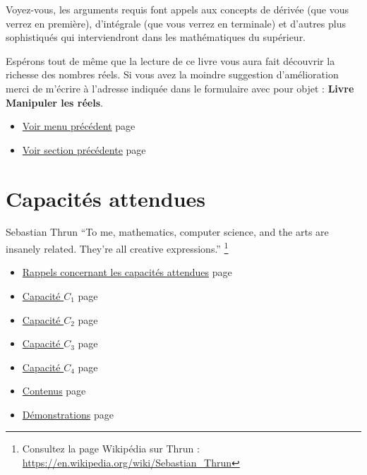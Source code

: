 \documentclass[a4paper,11pt]{book}
\begin{document}
Voyez-vous, les arguments requis font appels aux concepts
de dérivée (que vous verrez en première), d'intégrale (que vous
verrez en terminale) et d'autres plus sophistiqués qui
interviendront dans les mathématiques du supérieur.

Espérons tout de même que la lecture de ce livre vous aura fait
découvrir la richesse des nombres réels. Si vous avez la moindre
suggestion d'amélioration merci de m'écrire à l'adresse
indiquée dans le formulaire avec pour objet : \textbf{Livre Manipuler les
réels}.

\begin{itemize}
\item \hyperref[orgc112f4f]{Voir menu précédent}
page~\pageref{page:content6-menu}
\item \hyperref[org677ae69]{Voir section précédente}
page~\pageref{page:sec2.6.7exo12}
\end{itemize}


\clearpage

\part{Capacités attendues}
\label{sec:orgb7098ab}
\label{org9c65356}
\label{page:sec3capacities}

\begin{myquote}{Sebastian Thrun}
\enquote{To me, mathematics, computer science, and the arts are insanely
related. They’re all creative expressions.}
\footnote{Consultez la page Wikipédia sur Thrun : \url{https://en.wikipedia.org/wiki/Sebastian_Thrun}}
\end{myquote}


\clearpage

\label{orgb90956a}
\label{page:capacities-menu}
\begin{itemize}
\item \hyperref[org09fb152]{Rappels concernant les capacités attendues} page \pageref{page:sec3review}
\item \hyperref[org8554f1b]{Capacité \(C_1\)} page \pageref{page:sec3.2capacity1}
\item \hyperref[org3ab5664]{Capacité \(C_2\)} page \pageref{page:sec3.3capacity2}
\item \hyperref[org376c46d]{Capacité \(C_3\)} page \pageref{page:sec3.4capacity3}
\item \hyperref[org67b7ea7]{Capacité \(C_4\)} page \pageref{page:sec3.5capacity4}
\item \hyperref[org4fcdbf1]{Contenus} page \pageref{page:sec2contents}
\item \hyperref[org08a4120]{Démonstrations} page \pageref{page:sec4proofs}
\end{itemize}
\end{document}
